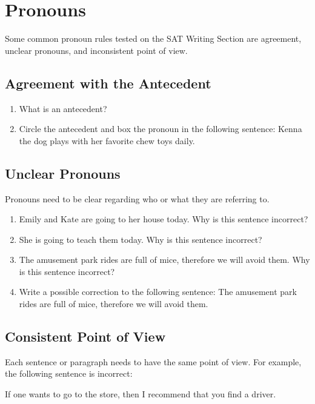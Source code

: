 \section{Pronouns}
Some common pronoun rules tested on the SAT Writing Section are agreement, unclear pronouns,
and inconsistent point of view.

\subsection{Agreement with the Antecedent}
\begin{enumerate}
\item{What is an antecedent?} \hrulefill
\item{Circle the antecedent and box the pronoun in the following sentence: Kenna the dog plays
with her favorite chew toys daily.}

\end{enumerate} 

\subsection{Unclear Pronouns}
Pronouns need to be clear regarding who or what they are referring to.
\begin{enumerate}
\item Emily and Kate are going to her house today. Why is this sentence incorrect?

\hrulefill
\item She is going to teach them today. Why is this sentence incorrect?

\hrulefill
\item The amusement park rides are full of mice, therefore we will avoid them. Why is this sentence
incorrect?

\hrulefill
\item Write a possible correction to the following sentence: The amusement park rides are full of
mice, therefore we will avoid them.

\hrulefill
\end{enumerate}

\subsection{Consistent Point of View}
Each sentence or paragraph needs to have the same point of view. For example, the following
sentence is incorrect: 

\bigskip
If one wants to go to the store, then I recommend that you find a driver.

